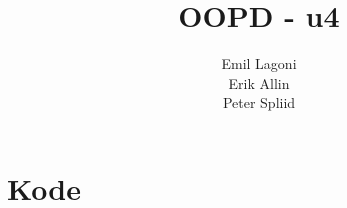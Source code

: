 \documentclass[a4paper,11pt]{article}
\title{\textbf{OOPD - u4}}
\author{Emil Lagoni\\Erik Allin\\Peter Spliid}
\begin{document}
\maketitle

\section*{Kode}
\end{document}
